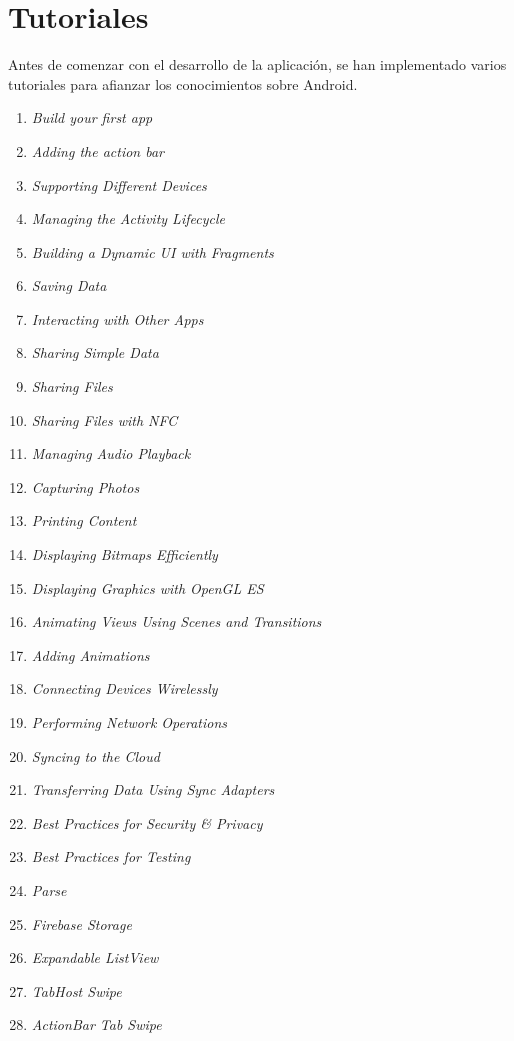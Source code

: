 \section{Tutoriales}
	Antes de comenzar con el desarrollo de la aplicación, se han implementado varios tutoriales para afianzar los conocimientos sobre Android.
	\begin{enumerate}
		\item {\it Build your first app}\cite{29:firstapp:online} %
		\item {\it Adding the action bar}
		\item {\it Supporting Different Devices}
		\item {\it Managing the Activity Lifecycle}
		\item {\it Building a Dynamic UI with Fragments}
		\item {\it Saving Data}
		\item {\it Interacting with Other Apps}
		\item {\it Sharing Simple Data}
		\item {\it Sharing Files}
		\item {\it Sharing Files with NFC}
		\item {\it Managing Audio Playback}
		\item {\it Capturing Photos}
		\item {\it Printing Content}
		\item {\it Displaying Bitmaps Efficiently}
		\item {\it Displaying Graphics with OpenGL ES}
		\item {\it Animating Views Using Scenes and Transitions}
		\item {\it Adding Animations}
		\item {\it Connecting Devices Wirelessly}
		\item {\it Performing Network Operations}
		\item {\it Syncing to the Cloud}
		\item {\it Transferring Data Using Sync Adapters}
		\item {\it Best Practices for Security \& Privacy}
		\item {\it Best Practices for Testing}
		\item {\it Parse}
		\item {\it Firebase Storage}
		\item {\it Expandable ListView}
		\item {\it TabHost Swipe}\cite{55:tabhostswipe:online}
		\item {\it ActionBar Tab Swipe}
	\end{enumerate}